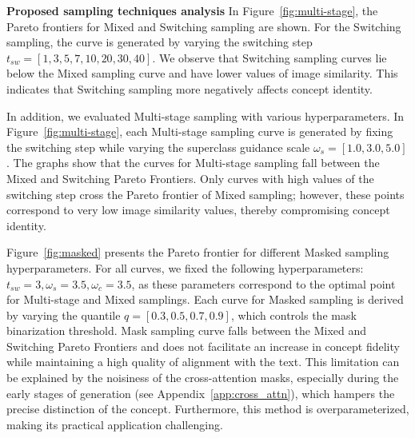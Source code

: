 \textbf{Proposed sampling techniques analysis}
In Figure~\ref{fig:multi-stage}, the Pareto frontiers for Mixed and Switching sampling are shown. For the Switching sampling, the curve is generated by varying the switching step $t_{sw} = [1, 3, 5, 7, 10, 20, 30, 40]$. We observe that Switching sampling curves lie below the Mixed sampling curve and have lower values of image similarity. This indicates that Switching sampling more negatively affects concept identity.

In addition, we evaluated Multi-stage sampling with various hyperparameters. In Figure~\ref{fig:multi-stage}, each Multi-stage sampling curve is generated by fixing the switching step while varying the superclass guidance scale $\omega_s = [1.0, 3.0, 5.0]$. The graphs show that the curves for Multi-stage sampling fall between the Mixed and Switching Pareto Frontiers. Only curves with high values of the switching step cross the Pareto frontier of Mixed sampling; however, these points correspond to very low image similarity values, thereby compromising concept identity.

Figure~\ref{fig:masked} presents the Pareto frontier for different Masked sampling hyperparameters. For all curves, we fixed the following hyperparameters: \( t_{sw} = 3, \omega_s = 3.5, \omega_c = 3.5 \), as these parameters correspond to the optimal point for Multi-stage and Mixed samplings. Each curve for Masked sampling is derived by varying the quantile \( q = [ 0.3, 0.5, 0.7, 0.9 ] \), which controls the mask binarization threshold. Mask sampling curve falls between the Mixed and Switching Pareto Frontiers and does not facilitate an increase in concept fidelity while maintaining a high quality of alignment with the text. This limitation can be explained by the noisiness of the cross-attention masks, especially during the early stages of generation (see Appendix~\ref{app:cross_attn}), which hampers the precise distinction of the concept. Furthermore, this method is overparameterized, making its practical application challenging.


